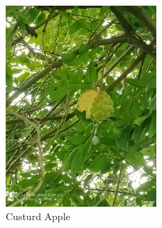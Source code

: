 \documentclass{article}
\begin{document}
	\begin{figure}
		
		\centering
		\includegraphics[width=0.5\textwidth]{e.jpg}
     	\caption{ {\huge Custurd Apple}}
     
	\end{figure}
\end{document}
